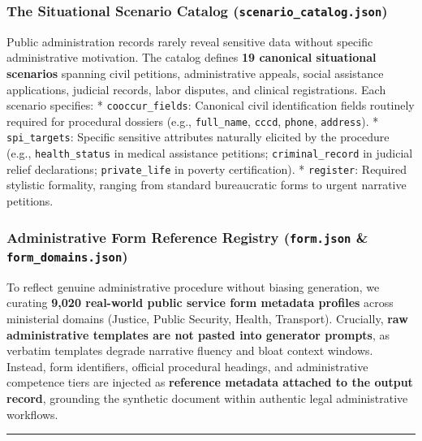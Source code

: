 \documentclass[
]{article}
\begin{document}
\subsubsection{\texorpdfstring{The Situational Scenario Catalog
(\texttt{scenario\_catalog.json})}{The Situational Scenario Catalog (scenario\_catalog.json)}}\label{the-situational-scenario-catalog-scenario_catalog.json}

Public administration records rarely reveal sensitive data without
specific administrative motivation. The catalog defines \textbf{19
canonical situational scenarios} spanning civil petitions,
administrative appeals, social assistance applications, judicial
records, labor disputes, and clinical registrations. Each scenario
specifies: * \texttt{cooccur\_fields}: Canonical civil identification
fields routinely required for procedural dossiers (e.g.,
\texttt{full\_name}, \texttt{cccd}, \texttt{phone}, \texttt{address}). *
\texttt{spi\_targets}: Specific sensitive attributes naturally elicited
by the procedure (e.g., \texttt{health\_status} in medical assistance
petitions; \texttt{criminal\_record} in judicial relief declarations;
\texttt{private\_life} in poverty certification). * \texttt{register}:
Required stylistic formality, ranging from standard bureaucratic forms
to urgent narrative petitions.

\subsubsection{\texorpdfstring{Administrative Form Reference Registry
(\texttt{form.json} \&
\texttt{form\_domains.json})}{Administrative Form Reference Registry (form.json \& form\_domains.json)}}\label{administrative-form-reference-registry-form.json-form_domains.json}

To reflect genuine administrative procedure without biasing generation,
we curating \textbf{9,020 real-world public service form metadata
profiles} across ministerial domains (Justice, Public Security, Health,
Transport). Crucially, \textbf{raw administrative templates are not
pasted into generator prompts}, as verbatim templates degrade narrative
fluency and bloat context windows. Instead, form identifiers, official
procedural headings, and administrative competence tiers are injected as
\textbf{reference metadata attached to the output record}, grounding the
synthetic document within authentic legal administrative workflows.

\begin{center}\rule{0.5\linewidth}{0.5pt}\end{center}
\end{document}
